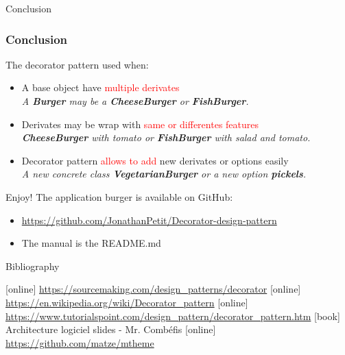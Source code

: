 \documentclass{beamer}
\begin{document}
  \begin{frame}{Conclusion}
    \frametitle{Conclusion}
    The decorator pattern used when:
    \begin{itemize}
      \item A base object have \textcolor{red}{multiple derivates} \\
      \textit{A \textbf{Burger} may be a \textbf{CheeseBurger} or \textbf{FishBurger}.}
      \item Derivates may be wrap with \textcolor{red}{same or differentes features} \\
      \textit{\textbf{CheeseBurger} with tomato or \textbf{FishBurger} with salad and tomato.}
      \item Decorator pattern \textcolor{red}{allows to add} new derivates or options easily \\
      \textit{A new concrete class \textbf{VegetarianBurger} or a new option \textbf{pickels}.}
    \end{itemize}
  \end{frame}

  \appendix

  \begin{frame}{Enjoy!}
    The application burger is available on GitHub:
    \begin{itemize}
      \item \url{https://github.com/JonathanPetit/Decorator-design-pattern}
      \item The manual is the README.md
    \end{itemize}
  \end{frame}

  \begin{frame}[allowframebreaks]{Bibliography}
    \begin{thebibliography}{9}
      [online]
       \url{https://sourcemaking.com/design_patterns/decorator}
      [online]
       \url{https://en.wikipedia.org/wiki/Decorator_pattern}
      [online]
       \url{https://www.tutorialspoint.com/design_pattern/decorator_pattern.htm}
      [book]
       Architecture logiciel slides - Mr. Comb\'efis
      [online]
       \url{https://github.com/matze/mtheme}

    \end{thebibliography}
  \end{frame}
\end{document}
